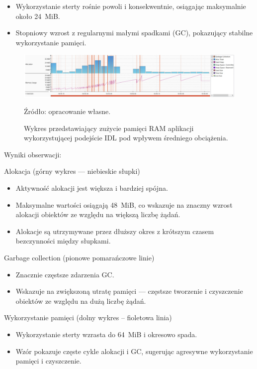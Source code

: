 \documentclass[runningheads,12pt]{llncs}
\begin{document}
\begin{itemize}
  \item Wykorzystanie sterty rośnie powoli i konsekwentnie, osiągając maksymalnie około 24~MiB.
  \item Stopniowy wzrost z regularnymi małymi spadkami (GC), pokazujący stabilne wykorzystanie pamięci.
\end{itemize}

\newpage

\begin{figure}
    \includegraphics[width=\linewidth]{images/idl-memory-low-graph.jpg}
    \caption{Wykres przedstawiający zużycie pamięci RAM aplikacji wykorzystującej podejście IDL pod wpływem średniego obciążenia.} \label{fig1}
    \vspace{0.5em}
    {\small Źródło: opracowanie własne.}
\end{figure}

Wyniki obserwacji:

Alokacja (górny wykres — niebieskie słupki)

\begin{itemize}
  \item Aktywność alokacji jest większa i bardziej spójna.
  \item Maksymalne wartości osiągają 48~MiB, co wskazuje na znaczny wzrost alokacji obiektów ze względu na większą liczbę żądań.
  \item Alokacje są utrzymywane przez dłuższy okres z krótszym czasem bezczynności między słupkami.
\end{itemize}

Garbage collection (pionowe pomarańczowe linie)

\begin{itemize}
  \item Znacznie częstsze zdarzenia GC.
  \item Wskazuje na zwiększoną utratę pamięci — częstsze tworzenie i czyszczenie obiektów ze względu na dużą liczbę żądań.
\end{itemize}

Wykorzystanie pamięci (dolny wykres – fioletowa linia)

\begin{itemize}
  \item Wykorzystanie sterty wzrasta do 64~MiB i okresowo spada.
  \item Wzór pokazuje częste cykle alokacji i GC, sugerując agresywne wykorzystanie pamięci i czyszczenie.
\end{itemize}
\end{document}
